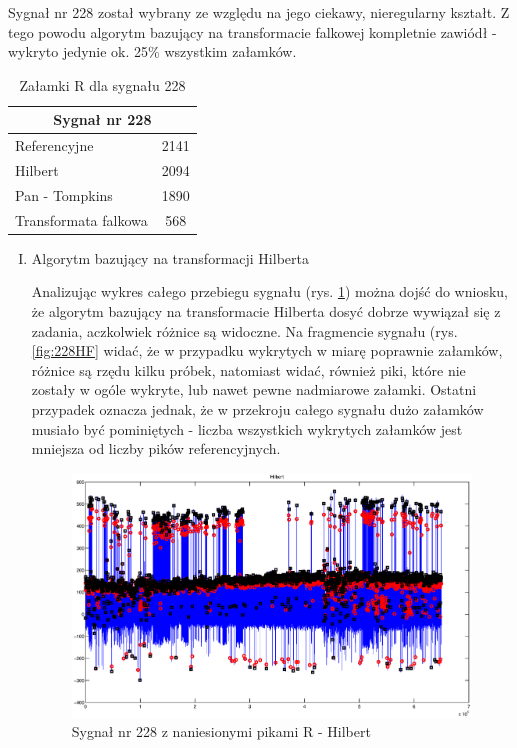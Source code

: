 \begin{itemize}
Sygnał nr 228 został wybrany ze względu na jego ciekawy, nieregularny kształt. Z tego powodu algorytm bazujący na transformacie falkowej kompletnie zawiódł - wykryto jedynie ok. 25\% wszystkim załamków.

\begin{table}[H]
\centering
\label{228peaks}
\caption{Załamki R dla sygnału 228}
\begin{tabular}{|l|c|}
\hline
\multicolumn{2}{|c|}{Sygnał nr 228}\\
\hline
Referencyjne & 2141 \\ \hline
Hilbert & 2094 \\ \hline
Pan - Tompkins & 1890 \\ \hline
Transformata falkowa & 568 \\ \hline
\end{tabular}
\end{table}

\begin{enumerate}[I.]
\item Algorytm bazujący na transformacji Hilberta

Analizując wykres całego przebiegu sygnału (rys. \ref{fig:228HC}) można dojść do wniosku, że algorytm bazujący na transformacie Hilberta dosyć dobrze wywiązał się z zadania, aczkolwiek różnice są widoczne. Na fragmencie sygnału (rys. \ref{fig:228HF} widać, że w przypadku wykrytych w miarę poprawnie załamków, różnice są rzędu kilku próbek, natomiast widać, również piki, które nie zostały w ogóle wykryte, lub nawet pewne nadmiarowe załamki. Ostatni przypadek oznacza jednak, że w przekroju całego sygnału dużo załamków musiało być pominiętych - liczba wszystkich wykrytych załamków jest mniejsza od liczby pików referencyjnych. 

\newpage
\begin{figure}[H]
\centering
\includegraphics[scale=0.35]{R_PEAKS/wektorowe/228_hilbert_calosc.eps}
\caption{Sygnał nr 228 z naniesionymi pikami R - Hilbert}
\label{fig:228HC}
\end{figure}


\end{enumerate}
\end{itemize}
